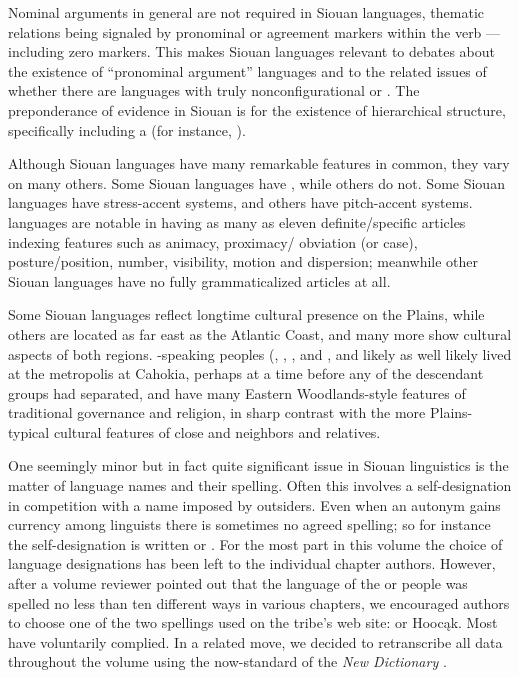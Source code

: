 \begin{refsection}
Nominal arguments in general are not required in Siouan languages, thematic relations being signaled by pronominal or agreement markers within the verb --- including zero markers. This makes Siouan languages relevant to debates about the existence of ``pronominal argument'' languages \citep{Jelinek1984} and to the related issues of whether there are languages with truly nonconfigurational or . The preponderance of evidence in Siouan is for the existence of hierarchical structure, specifically including a  (for instance, \citealt{West2003,Johnson2016, JohnsonEtAl2016, Rosen2016}).


Although Siouan languages have many remarkable features in common, they vary on many others.  Some Siouan languages have , while others do not. Some Siouan languages have stress-accent systems, and others have pitch-accent systems.  languages are notable in having as many as eleven definite/specific articles indexing features such as animacy, proximacy/ obviation (or case), posture/position, number, visibility, motion and dispersion; meanwhile other Siouan languages have no fully grammaticalized articles at all.


Some Siouan languages reflect longtime cultural presence on the Plains, while others are located as far east as the Atlantic Coast, and many more show cultural aspects of both regions. -speaking peoples (, , ,  and , and likely  as well \citep{Kasak2016,Koontz1995a} likely lived at the metropolis at Cahokia, perhaps at a time before any of the descendant groups had separated, and have many Eastern Woodlands-style features of traditional governance and religion, in sharp contrast with the more Plains-typical cultural features of close  and  neighbors and relatives.

One seemingly minor but in fact quite significant issue in Siouan linguistics is the matter of language names and their spelling. Often this involves a self-designation in competition with a name imposed by outsiders. Even when an autonym gains currency among linguists there is sometimes no agreed spelling; so for instance the  self-designation is written  or . For the most part in this volume the choice of language designations has been left to the individual chapter authors. However, after a volume reviewer pointed out that the language of the  or  people was spelled no less than ten different ways in various chapters, we encouraged authors to choose one of the two spellings used on the tribe's web site:   or Hooc\k{a}k.  Most have voluntarily complied.  In a related move, we decided to retranscribe all  data throughout the volume using the now-standard  of the \textit{New  Dictionary} \citep{Ullrich2012}.


\end{refsection}
